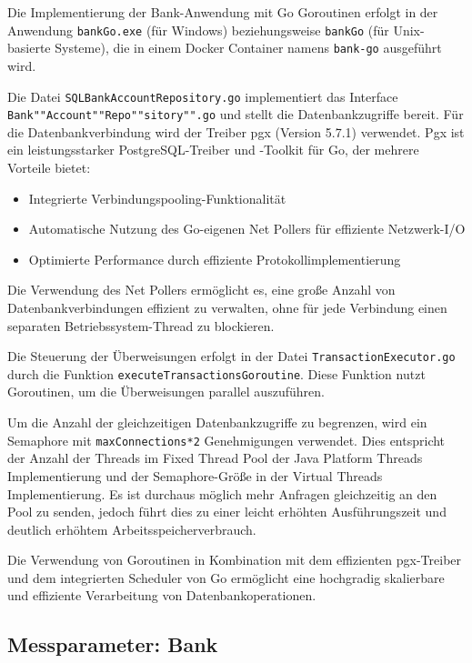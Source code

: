 \documentclass[fontsize=12pt,paper=a4,twoside=semi,parskip=half-,headsepline,headinclude]{scrreprt}
\begin{document}
Die Implementierung der Bank-Anwendung mit Go Goroutinen erfolgt in der Anwendung \texttt{bankGo.exe} (für Windows) beziehungsweise \texttt{bankGo} (für Unix-basierte Systeme), die in einem Docker Container namens \texttt{bank-go} ausgeführt wird.

Die Datei \texttt{SQLBankAccountRepository.go} implementiert das Interface \texttt{Bank""Account""Repo""sitory"".go} und stellt die Datenbankzugriffe bereit. Für die Datenbankverbindung wird der Treiber pgx (Version 5.7.1) verwendet. Pgx ist ein leistungsstarker Postgre\-SQL-Treiber und -Toolkit für Go, der mehrere Vorteile bietet:

\begin{itemize}
	\item Integrierte Verbindungspooling-Funktionalität
	\item Automatische Nutzung des Go-eigenen Net Pollers für effiziente Netzwerk-I/O
	\item Optimierte Performance durch effiziente Protokollimplementierung
\end{itemize}

Die Verwendung des Net Pollers ermöglicht es, eine große Anzahl von Datenbankverbindungen effizient zu verwalten, ohne für jede Verbindung einen separaten Betriebssystem-Thread zu blockieren.

Die Steuerung der Überweisungen erfolgt in der Datei \texttt{TransactionExecutor.go} durch die Funktion \texttt{executeTransactionsGoroutine}. Diese Funktion nutzt Goroutinen, um die Überweisungen parallel auszuführen.

Um die Anzahl der gleichzeitigen Datenbankzugriffe zu begrenzen, wird ein Semaphore mit \texttt{maxConnections*2} Genehmigungen verwendet. Dies entspricht der Anzahl der Threads im Fixed Thread Pool der Java Platform Threads Implementierung und der Semaphore-Größe in der Virtual Threads Implementierung. Es ist durchaus möglich mehr Anfragen gleichzeitig an den Pool zu senden, jedoch führt dies zu einer leicht erhöhten Ausführungszeit und deutlich erhöhtem Arbeitsspeicherverbrauch.

Die Verwendung von Goroutinen in Kombination mit dem effizienten pgx-Treiber und dem integrierten Scheduler von Go ermöglicht eine hochgradig skalierbare und effiziente Verarbeitung von Datenbankoperationen.

\subsection{Messparameter: Bank}
\label{subsec:parabank}
\end{document}
